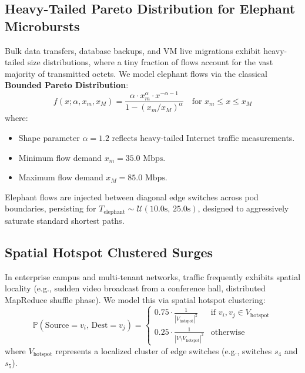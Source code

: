 \documentclass[12pt,a4paper,oneside]{report}
\begin{document}
\subsection{Heavy-Tailed Pareto Distribution for Elephant Microbursts}
Bulk data transfers, database backups, and VM live migrations exhibit heavy-tailed size distributions, where a tiny fraction of flows account for the vast majority of transmitted octets. We model elephant flows via the classical \textbf{Bounded Pareto Distribution}:
\begin{equation}
    f(x; \alpha, x_m, x_M) = \frac{\alpha \cdot x_m^\alpha \cdot x^{-\alpha - 1}}{1 - (x_m / x_M)^\alpha} \quad \text{for } x_m \le x \le x_M
\end{equation}
where:
\begin{itemize}
    \item Shape parameter $\alpha = 1.2$ reflects heavy-tailed Internet traffic measurements.
    \item Minimum flow demand $x_m = 35.0\text{ Mbps}$.
    \item Maximum flow demand $x_M = 85.0\text{ Mbps}$.
\end{itemize}
Elephant flows are injected between diagonal edge switches across pod boundaries, persisting for $T_{\text{elephant}} \sim \mathcal{U}(10.0\text{s}, \, 25.0\text{s})$, designed to aggressively saturate standard shortest paths.

\subsection{Spatial Hotspot Clustered Surges}
In enterprise campus and multi-tenant networks, traffic frequently exhibits spatial locality (e.g., sudden video broadcast from a conference hall, distributed MapReduce shuffle phase). We model this via spatial hotspot clustering:
\begin{equation}
    \mathbb{P}(\text{Source} = v_i, \, \text{Dest} = v_j) = \begin{cases}
        0.75 \cdot \frac{1}{|V_{\text{hotspot}}|^2} & \text{if } v_i, v_j \in V_{\text{hotspot}} \\[0.5em]
        0.25 \cdot \frac{1}{|V \setminus V_{\text{hotspot}}|^2} & \text{otherwise}
    \end{cases}
\end{equation}
where $V_{\text{hotspot}}$ represents a localized cluster of edge switches (e.g., switches $s_4$ and $s_5$).
\end{document}
